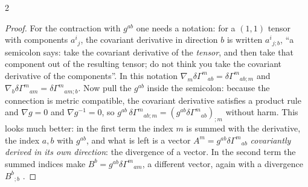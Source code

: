 \begin{paracol}{2}
\begin{proof}
For the contraction with $g^{ab}$ one needs a notation: for a $(1,1)$ tensor with components $a^i{}_j$, the covariant derivative in direction $b$ is written $a^i{}_{j;b}$, ``a semicolon says: take the covariant derivative of the \emph{tensor}, and then take that component out of the resulting tensor; do not think you take the covariant derivative of the components''. In this notation $\nabla_m\delta\Gamma^m{}_{ab}=\delta\Gamma^m{}_{ab;m}$ and $\nabla_b\delta\Gamma^m{}_{am}=\delta\Gamma^m{}_{am;b}$. Now pull the $g^{ab}$ inside the semicolon: because the connection is metric compatible, the covariant derivative satisfies a product rule and $\nabla g=0$ and $\nabla g^{-1}=0$, so $g^{ab}\,\delta\Gamma^m{}_{ab;m}=(g^{ab}\delta\Gamma^m{}_{ab})_{;m}$ without harm. This looks much better: in the first term the index $m$ is summed with the derivative, the index $a,b$ with $g^{ab}$, and what is left is a vector $A^m=g^{ab}\delta\Gamma^m{}_{ab}$ \emph{covariantly derived in its own direction}: the divergence of a vector. In the second term the summed indices make $B^b=g^{ab}\delta\Gamma^m{}_{am}$, a different vector, again with a divergence $B^b{}_{;b}$ .


\end{proof}
\end{paracol}
